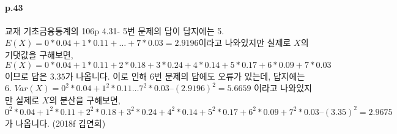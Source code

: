 \documentclass[a4paper]{article}
\begin{document}
\paragraph{p.43} %
\label{par:p_43}
교재 기초금융통계의 106p 4.31- 5번 문제의 답이 답지에는 
5. $E(X)= 0*0.04+ 1*0.11+ … + 7*0.03 = 2.9196 $이라고 나와있지만
실제로 $X$의 기댓값을 구해보면,
$E(X)= 0*0.04+ 1*0.11+ 2*0.18+ 3*0.24+ 4*0.14+ 5*0.17+ 6*0.09+ 7*0.03$이므로 답은 $3.35$가 나옵니다.
이로 인해 6번 문제의 답에도 오류가 있는데, 답지에는
6. $Var(X)= 0^2*0.04+ 1^2*0.11 … 7^2*0.03 – (2.9196)^2 = 5.6659$ 이라고 나와있지만
실제로 $X$의 분산을 구해보면,
$0^2*0.04+ 1^2*0.11+ 2^2*0.18+ 3^2*0.24+ 4^2*0.14+ 5^2*0.17+ 6^2*0.09+ 7^2*0.03 – (3.35)^2= 2.9675$가 나옵니다. (2018f 김연희)
\end{document}
